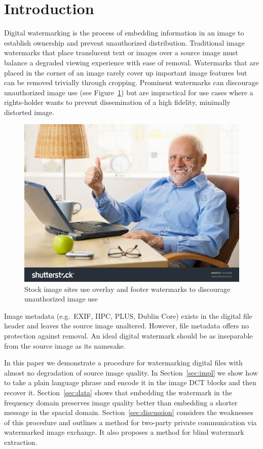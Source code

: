 \section{Introduction}\label{sec:intro}
Digital watermarking is the process of embedding information in an image to establish ownership and prevent unauthorized distribution.
Traditional image watermarks that place translucent text or images over a source image must balance a degraded viewing experience with ease of removal.
Watermarks that are placed in the corner of an image rarely cover up important image features but can be removed trivially through cropping.
Prominent watermarks can discourage unauthorized image use (see Figure~\ref{fig:thumbs-up-wm}) but are impractical for use cases where a rights-holder wants to prevent dissemination of a high fidelity, minimally distorted image.

\begin{figure}[tbph]
  \centering
  \includegraphics[width=0.7\linewidth]{graphics/thumbs-up-wm}
  \caption{Stock image sites use overlay and footer watermarks to discourage unauthorized image use~\cite{stocklite:old-man}}
  \label{fig:thumbs-up-wm}
\end{figure}

Image metadata (e.g.\ EXIF, IIPC, PLUS, Dublin Core) exists in the digital file header and leaves the source image unaltered.
However, file metadata offers no protection against removal.\citeneeded{} An ideal digital watermark should be as inseparable from the source image as its namesake.

In this paper we demonstrate a procedure for watermarking digital files with almost no degradation of source image quality.
In Section~\ref{sec:impl} we show how to take a plain language phrase and encode it in the image DCT blocks and then recover it.
Section~\ref{sec:data} shows that embedding the watermark in the frequency domain preserves image quality better than embedding a shorter message in the spacial domain.
Section~\ref{sec:discussion} considers the weaknesses of this procedure and outlines a method for two-party private communication via watermarked image exchange.
It also proposes a method for blind watermark extraction.
